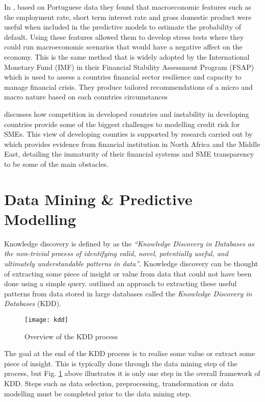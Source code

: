 In \cite{antunes_estimating_2005}, based on Portuguese data they found that macroeconomic features such as the employment rate, short term interest rate and gross domestic product were useful when included in the predictive models to estimate the probability of default. Using these features allowed them to develop stress tests where they could run macroeconomic scenarios that would have a negative affect on the economy. This is the same method that is widely adopted by the International Monetary Fund (IMF) in their Financial Stability Assessment Program (FSAP) which is used to assess a countries financial sector resilience and capacity to manage financial crisis. They produce tailored recommendations of a micro and macro nature based on each countries circumstances \citep{marston_financial_2001} 

\cite{ardic_small_2011} discusses how competition in developed countries and instability in developing countries provide some of the biggest challenges to modelling credit risk for SMEs. This view of developing counties is supported by research carried out by \cite{rocha_status_2011} which provides evidence from financial institution in North Africa and the Middle East, detailing the immaturity of their financial systems and SME transparency to be some of the main obstacles. 


\section{Data Mining \& Predictive Modelling}\label{sec:dataMining}
Knowledge discovery is defined by \cite{frawley_knowledge_1992} as the \textit{``Knowledge Discovery in Databases as the non-trivial process of identifying valid, novel, potentially useful, and ultimately understandable patterns in data''}. Knowledge discovery can be thought of extracting some piece of insight or value from data that could not have been done using a simple query. \cite{fayyad_knowledge_1996} outlined an approach to extracting these useful patterns from data stored in large databases called the \textit{Knowledge Discovery in Databases} (KDD).

\begin{figure}[H]
	\texttt{[image: kdd]}
	\caption{Overview of the KDD process  \\
		\cite[Source:][]{fayyad_knowledge_1996}		
	}
	\label{fig:kdd}
\end{figure}

The goal at the end of the KDD process is to realise some value or extract some piece of insight. This is typically done through the data mining step of the process, but Fig. \ref{fig:kdd} above illustrates it is only one step in the overall framework of KDD. Steps such as data selection, preprocessing, transformation or data modelling must be completed prior to the data mining step. 


